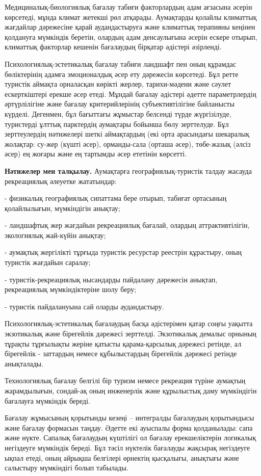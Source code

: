 Медициналық-биологиялық бағалау табиғи факторлардың адам ағзасына әсерін
көрсетеді, мұнда климат жетекші рөл атқарады. Аумақтарды қолайлы
климаттық жағдайлар дәрежесіне қарай аудандастыруға және климаттық
терапияны кеңінен қолдануға мүмкіндік беретін, олардың адам денсаулығына
әсерін ескере отырып, климаттық факторлар кешенін бағалаудың бірқатар
әдістері әзірленді.

Психологиялық-эстетикалық бағалау табиғи ландшафт пен оның құрамдас
бөліктерінің адамға эмоционалдық әсер ету дәрежесін көрсетеді. Бұл ретте
туристік аймақта орналасқан көрікті жерлер, тарихи-мәдени және сәулет
ескерткіштері ерекше әсер етеді. Мұндай бағалау әдістері әдетте
параметрлердің әртүрлілігіне және бағалау критерийлерінің
субъективтілігіне байланысты күрделі. Дегенмен, бұл бағыттағы жұмыстар
белсенді түрде жүргізілуде, туристерді ұлттық парктердің аумақтары
бойынша бөлу зерттелуде. Бұл зерттеулердің нәтижелері шеткі аймақтардың
(екі орта арасындағы шекаралық жолақтар: су-жер (күшті әсер),
орманды-сала (орташа әсер), төбе-жазық (әлсіз әсер) ең жоғары және ең
тартымды әсер ететінін көрсетті.

{\bfseries Нәтижелер мен талқылау.} Аумақтарға географиялық-туристік талдау
жасауда рекреациялық әлеуетке жататындар:

- физикалық географиялық сипаттама бере отырып, табиғат ортасының
қолайлылығын, мүмкіндігін анықтау;

- ландшафтық жер жағдайын рекреациялық бағалай, олардың
аттрактивтілігін, экологиялық жай-күйін анықтау;

- аумақтық жергілікті тұрғыда туристік ресурстар реестрін құрастыру,
оның туристік жағдайын саралау;

- туристік-рекреациялық нысандарды пайдалану дәрежесін анықтап,
рекреациялық мүмкіндіктеріне шолу беру;

- туристік пайдалануына сай оларды аудандастыру.

Психологиялық-эстетикалық бағалаудың басқа әдістерімен қатар соңғы
уақытта экзотикалық және бірегейлік дәрежесі зерттелді. Экзотикалық
демалыс орнының тұрақты тұрғылықты жеріне қатысты қарама-қарсылық
дәрежесі ретінде, ал бірегейлік - заттардың немесе құбылыстардың
бірегейлік дәрежесі ретінде анықталады.

Технологиялық бағалау белгілі бір туризм немесе рекреация түріне
аумақтың жарамдылығын, сондай-ақ оның инженерлік және құрылыстық даму
мүмкіндігін бағалауға мүмкіндік береді.

Бағалау жұмысының қорытынды кезеңі -- интегралды бағалаудың қорытындысы
және бағалау формасын таңдау. Әдетте екі ауыспалы форма қолданылады:
сапа және нүкте. Сапалық бағалаудың күштілігі ол бағалау ерекшеліктерін
логикалық негіздеуге мүмкіндік береді. Бұл тәсіл нүктелік бағалауды
жақсырақ негіздеуге ықпал етеді, оның айрықша белгілері өрнектің
қысқалығы, анықтығы және салыстыру мүмкіндігі болып табылады.

